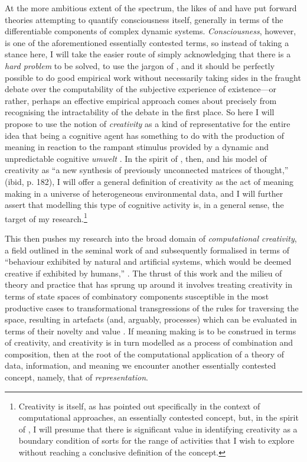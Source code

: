 At the more ambitious extent of the spectrum, the likes of \cite{Koch2004} and \cite{Tononi2008} have put forward theories attempting to quantify consciousness itself, generally in terms of the differentiable components of complex dynamic systems.  \emph{Consciousness}, however, is one of the aforementioned essentially contested terms, so instead of taking a stance here, I will take the easier route of simply acknowledging that there is a \emph{hard problem} to be solved, to use the jargon of \cite{Chalmers1996}, and it should be perfectly possible to do good empirical work without necessarily taking sides in the fraught debate over the computability of the subjective experience of existence---or rather, perhaps an effective empirical approach comes about precisely from recognising the intractability of the debate in the first place.  So here I will propose to use the notion of \emph{creativity} as a kind of representative for the entire idea that being a cognitive agent has something to do with the production of meaning in reaction to the rampant stimulus provided by a dynamic and unpredictable cognitive \emph{umwelt} \citep{VonUexkull1957}.  In the spirit of \cite{Koestler1964}, then, and his model of creativity as ``a new synthesis of previously unconnected matrices of thought,'' (ibid, p. 182), I will offer a general definition of creativity as the act of meaning making in a universe of heterogeneous environmental data, and I will further assert that modelling this type of cognitive activity is, in a general sense, the target of my research.\footnote{Creativity is itself, as \cite{Colton} has pointed out specifically in the context of computational approaches, an essentially contested concept, but, in the spirit of \cite{Gallie1956}, I will presume that there is significant value in identifying creativity as a boundary condition of sorts for the range of activities that I wish to explore without reaching a conclusive definition of the concept.}

This then pushes my research into the broad domain of \emph{computational creativity}, a field outlined in the seminal work of \cite{Boden1990} and subsequently formalised in terms of ``behaviour  exhibited  by  natural  and artificial systems, which would be deemed creative if exhibited by humans,'' \citep[][p. 206]{Wiggins2006b}.  The thrust of this work and the milieu of theory and practice that has sprung up around it involves treating creativity in terms of state spaces of combinatory components susceptible in the most productive cases to transformational transgressions of the rules for traversing the space, resulting in artefacts (and, arguably, processes) which can be evaluated in terms of their novelty and value .  If meaning making is to be construed in terms of creativity, and creativity is in turn modelled as a process of combination and composition, then at the root of the computational application of a theory of data, information, and meaning we encounter another essentially contested concept, namely, that of \emph{representation}.

